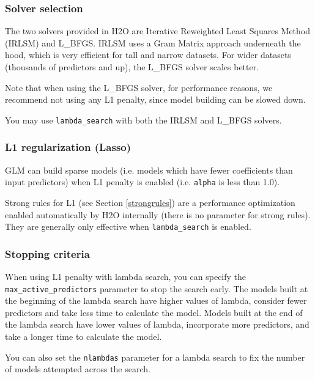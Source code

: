 \subsubsection{Solver selection}

The two solvers provided in H2O are Iterative Reweighted Least Squares Method (IRLSM) and L\_BFGS.  IRLSM uses
a Gram Matrix approach underneath the hood, which is very efficient for tall and narrow datasets.  For wider 
datasets (thousands of predictors and up), the L\_BFGS solver scales better.

Note that when using the L\_BFGS solver, for performance reasons, we recommend not using any L1 penalty, since
model building can be slowed down.

You may use \texttt{lambda\_search} with both the IRLSM and L\_BFGS solvers.

\subsubsection{L1 regularization (Lasso)}

GLM can build sparse models (i.e. models which have fewer coefficients than input predictors) when L1 penalty is
enabled (i.e. \texttt{alpha} is less than 1.0).

Strong rules for L1 (see Section \ref{strongrules}) are a performance optimization enabled automatically by H2O
internally (there is no parameter for strong rules).  They are generally only effective when
\texttt{lambda\_search} is enabled.

\subsubsection{Stopping criteria}

When using L1 penalty with lambda search, you can specify the \texttt{max\_active\_predictors} parameter to stop
the search early.  The models built at the beginning of the lambda search have higher values of lambda, consider
fewer predictors and take less time to calculate the model.  Models built at the end of the lambda search have
lower values of lambda, incorporate more predictors, and take a longer time to calculate the model.

\bigskip
\waterExampleInR


\waterExampleInPython


You can also set the \texttt{nlambdas} parameter for a lambda search to fix the number of models attempted across
the search.

